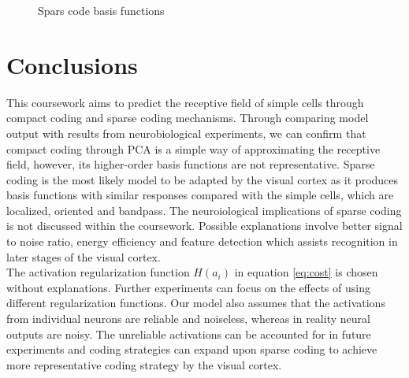 \documentclass[journal]{IEEEtran}
\begin{document}
\begin{figure}[htpb]
\centering     %
{}
\caption{Spars code basis functions}
\label{fig:spar}
\end{figure}
\section{Conclusions}
This coursework aims to predict the receptive field of simple cells through compact coding and sparse coding mechanisms. Through comparing model output with results from neurobiological experiments, we can confirm that compact coding through PCA is a simple way of approximating the receptive field, however, its higher-order basis functions are not representative. Sparse coding is the most likely model to be adapted by the visual cortex as it produces basis functions with similar responses compared with the simple cells, which are localized, oriented and bandpass. The neuroiological implications of sparse coding is not discussed within the coursework. Possible explanations involve better signal to noise ratio, energy efficiency and feature detection which assists recognition in later stages of the visual cortex. \\
The activation regularization function $H(a_i)$ in equation \ref{eq:cost} is chosen without explanations. Further experiments can focus on the effects of using different regularization functions. Our model also assumes that the activations from individual neurons are reliable and noiseless, whereas in reality neural outputs are noisy. The unreliable activations can be accounted for in future experiments and coding strategies can expand upon sparse coding to achieve more representative coding strategy by the visual cortex.
\end{document}
